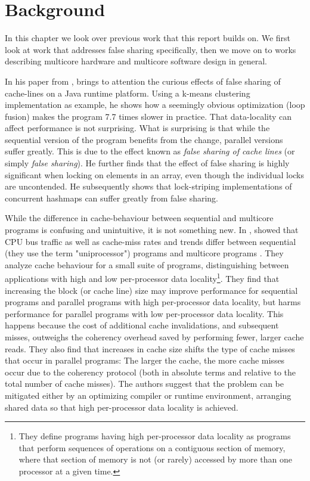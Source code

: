 \chapter{Background}
\label{chap:background}
In this chapter we look over previous work that this report builds on. We first
look at work that addresses false sharing specifically, then we move on to works
describing multicore hardware and multicore software design in general.

In his paper from \citeyear{mystery} \cite{mystery}, \citeauthor{mystery} brings
to attention the curious effects of false sharing of cache-lines on a Java
runtime platform. Using a k-means clustering implementation as example, he shows
how a seemingly obvious optimization (loop fusion) makes the program 7.7 times
slower in practice. That data-locality can affect performance is not surprising.
What is surprising is that while the sequential version of the program benefits
from the change, parallel versions suffer greatly. This is due to the effect
known as \textit{false sharing of cache lines} (or simply \textit{false
sharing}). He further finds that the effect of false sharing is highly
significant when locking on elements in an array, even though the individual
locks are uncontended. He subsequently shows that lock-striping implementations
of concurrent hashmaps can suffer greatly from false sharing.

While the difference in cache-behaviour between sequential and multicore programs
is confusing and unintuitive, it is not something new. In \citeyear{eggersbus},
\citeauthor{eggersbus} showed that CPU bus traffic as well as cache-miss
rates and trends differ between sequential (they use the term "uniprocessor")
programs and multicore programs \cite{eggersbus}.
They analyze cache behaviour for a small suite of programs, distinguishing
between applications with high and low per-processor data locality\footnote{They
define programs having high per-processor data locality as programs that perform
sequences of operations on a contiguous section of memory, where that section of
memory is not (or rarely) accessed by more than one processor at a given time.}.
They find that increasing the block (or cache line) size may improve
performance for sequential programs and parallel programs with high
per-processor data locality, but harms performance for parallel programs with
low per-processor data locality. This happens because the cost of additional cache
invalidations, and subsequent misses, outweighs the coherency overhead saved by
performing fewer, larger cache reads. They also find that increases in cache
size shifts the type of cache misses that occur in parallel programs: The larger
the cache, the more cache misses occur due to the coherency protocol (both in
absolute terms and relative to the total number of cache misses). The authors
suggest that the problem can be mitigated either by an optimizing compiler or
runtime environment, arranging shared data so that high per-processor data
locality is achieved.

